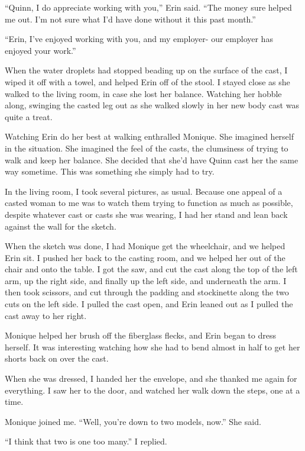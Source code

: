 ``Quinn, I do appreciate working with you,'' Erin said. ``The money sure helped me out. I'm
not sure what I'd have done without it this past month.''

``Erin, I've enjoyed working with you, and my employer- our employer has enjoyed your work.''

When the water droplets had stopped beading up on the surface of the cast, I wiped it off
with a towel, and helped Erin off of the stool. I stayed close as she walked to the living room,
in case she lost her balance. Watching her hobble along, swinging the casted leg out as she
walked slowly in her new body cast was quite a treat.

\begin{thought}
Watching Erin do her best at walking enthralled Monique. She imagined herself in the
situation. She imagined the feel of the casts, the clumsiness of trying to walk and keep her
balance. She decided that she'd have Quinn cast her the same way sometime. This was something
she simply had to try.
\end{thought}

In the living room, I took several pictures, as usual. Because one appeal of a casted woman
to me was to watch them trying to function as much as possible, despite whatever cast or casts
she was wearing, I had her stand and lean back against the wall for the sketch.

When the sketch was done, I had Monique get the wheelchair, and we helped Erin sit. I
pushed her back to the casting room, and we helped her out of the chair and onto the table. I
got the saw, and cut the cast along the top of the left arm, up the right side, and finally up
the left side, and underneath the arm. I then took scissors, and cut through the padding and
stockinette along the two cuts on the left side. I pulled the cast open, and Erin leaned out as
I pulled the cast away to her right.

Monique helped her brush off the fiberglass flecks, and Erin began to dress herself. It was
interesting watching how she had to bend almost in half to get her shorts back on over the cast.

When she was dressed, I handed her the envelope, and she thanked me again for everything. I
saw her to the door, and watched her walk down the steps, one at a time.

Monique joined me. ``Well, you're down to two models, now.'' She said.

``I think that two is one too many.'' I replied.

